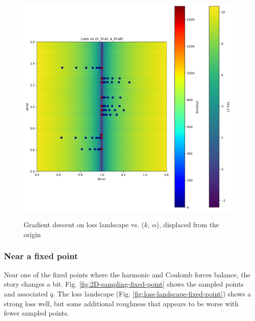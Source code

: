 \documentclass[]{article}
\begin{document}
\begin{figure}[H]
	\caption{Gradient descent on loss landscape vs. ($k$, $\alpha$), displaced from the origin}
	\centering
	\includegraphics[scale=0.60]{gradient-descent-paths-farther-away.png}
	\label{fig:gradient-descent-paths-father-away}
\end{figure}

\subsubsection{Near a fixed point}
Near one of the fixed points where the harmonic and Coulomb forces balance, the story changes a bit. Fig. \ref{fig:2D-sampling-fixed-point} shows the sampled points and associated $\ddot{q}$. The loss landscape (Fig. \ref{fig:loss-landscape-fixed-point}) shows a strong loss well, but some additional roughness that appears to be worse with fewer sampled points. 
\end{document}
